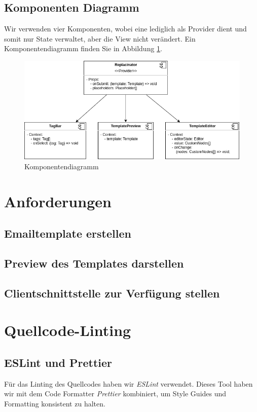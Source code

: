 \documentclass[a4paper, titlepage]{article}
\begin{document}
  \subsection{Komponenten Diagramm}
  Wir verwenden vier Komponenten, wobei eine lediglich
  als Provider dient und somit nur State verwaltet,
  aber die View nicht verändert. Ein Komponentendiagramm
  finden Sie in Abbildung \ref{component-diagram}.
  \begin{figure}
    \includegraphics[width=\textwidth]{images/react-replacinator.png}
    \caption{Komponentendiagramm}
    \label{component-diagram}
  \end{figure}
  \section{Anforderungen}
  \subsection{Emailtemplate erstellen}
  \subsection{Preview des Templates darstellen}
  \subsection{Clientschnittstelle zur Verfügung stellen}
  \subsection{}
  \section{Quellcode-Linting}
  \subsection{ESLint und Prettier}
  Für das Linting des Quellcodes haben wir \emph{ESLint} verwendet.
  Dieses Tool haben wir mit dem Code Formatter \emph{Prettier}
  kombiniert, um Style Guides und Formatting konsistent
  zu halten.
\end{document}

